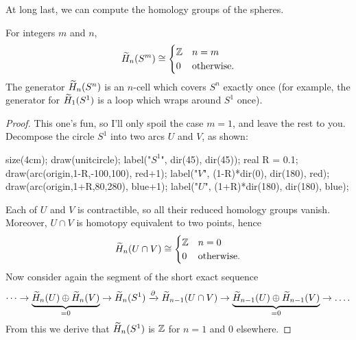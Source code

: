 At long last, we can compute the homology groups of the spheres.
\begin{theorem}
	\label{thm:reduced_homology_sphere}
	For integers $m$ and $n$,
	\[ \widetilde H_n(S^m) \cong
	\begin{cases}
		\mathbb Z & n=m \\
		0 & \text{otherwise}.
	\end{cases}
	\]
	The generator $\widetilde H_n(S^n)$ is an $n$-cell which covers $S^n$
	exactly once (for example, the generator for $\widetilde H_1(S^1)$
	is a loop which wraps around $S^1$ once).
\end{theorem}
\begin{proof}
	This one's fun, so I'll only spoil the case $m=1$, and leave the rest to you.
	Decompose the circle $S^1$ into two arcs $U$ and $V$, as shown:
	\begin{center}
		\begin{asy}
			size(4cm);
			draw(unitcircle);
			label("$S^1$", dir(45), dir(45));
			real R = 0.1;
			draw(arc(origin,1-R,-100,100), red+1);
			label("$V$", (1-R)*dir(0), dir(180), red);
			draw(arc(origin,1+R,80,280), blue+1);
			label("$U$", (1+R)*dir(180), dir(180), blue);
		\end{asy}
	\end{center}
	Each of $U$ and $V$ is contractible, so all their reduced homology groups vanish.
	Moreover, $U \cap V$ is homotopy equivalent to two points,
	hence
	\[ \widetilde H_n(U \cap V) \cong
		\begin{cases}
			\mathbb Z & n = 0 \\
			0 & \text{otherwise}.
		\end{cases}
	\]
	Now consider again the segment of the short exact sequence
	\[
		\dots \to
		\underbrace{\widetilde H_n(U) \oplus \widetilde H_n(V)}_{= 0} \to
		\widetilde H_n(S^1) \xrightarrow{\partial} \widetilde H_{n-1}(U \cap V) \to
		\underbrace{\widetilde H_{n-1}(U) \oplus \widetilde H_{n-1}(V)}_{=0} \to \dots.
	\]
	From this we derive that $\widetilde H_n(S^1)$ is $\mathbb Z$ for $n=1$ and $0$ elsewhere.


\end{proof}
